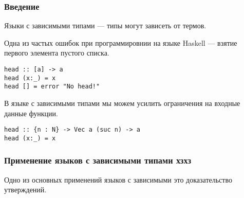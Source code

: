 
\begin{frame}[fragile]
\frametitle{Введение}

Языки с зависимыми типами --- типы могут зависеть от термов.

Одна из частых ошибок при программировнии на языке Haskell --- взятие первого элемента пустого списка.

\begin{verbatim}
head :: [a] -> a
head (x:_) = x
head [] = error "No head!"
\end{verbatim}

В языке с зависимыми типами мы можем усилить ограничения на входные данные функции.

\begin{verbatim}
head :: {n : N} -> Vec a (suc n) -> a
head (x:_) = x
\end{verbatim}

\end{frame}

\begin{frame}
\frametitle{Применение языков с зависимыми типами хзхз}
Одно из основных применений языков с зависимыми это доказательство утверждений.

\end{frame}


